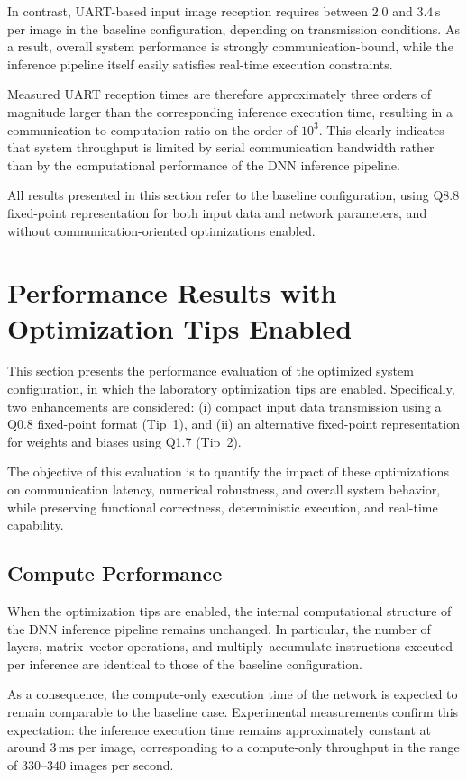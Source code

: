 In contrast, UART-based input image reception requires between $2.0$ and
$3.4\,\mathrm{s}$ per image in the baseline configuration, depending on transmission
conditions.
As a result, overall system performance is strongly communication-bound, while the
inference pipeline itself easily satisfies real-time execution constraints.

Measured UART reception times are therefore approximately three orders of magnitude
larger than the corresponding inference execution time, resulting in a
communication-to-computation ratio on the order of $10^3$.
This clearly indicates that system throughput is limited by serial communication
bandwidth rather than by the computational performance of the DNN inference
pipeline.

All results presented in this section refer to the baseline configuration, using
Q8.8 fixed-point representation for both input data and network parameters, and
without communication-oriented optimizations enabled.
\section{Performance Results with Optimization Tips Enabled}

This section presents the performance evaluation of the optimized system
configuration, in which the laboratory optimization tips are enabled.
Specifically, two enhancements are considered:
(i) compact input data transmission using a Q0.8 fixed-point format (Tip~1), and
(ii) an alternative fixed-point representation for weights and biases using Q1.7
(Tip~2).

The objective of this evaluation is to quantify the impact of these optimizations
on communication latency, numerical robustness, and overall system behavior,
while preserving functional correctness, deterministic execution, and real-time
capability.

\subsection{Compute Performance}

When the optimization tips are enabled, the internal computational structure of
the DNN inference pipeline remains unchanged.
In particular, the number of layers, matrix--vector operations, and
multiply--accumulate instructions executed per inference are identical to those
of the baseline configuration.

As a consequence, the compute-only execution time of the network is expected to
remain comparable to the baseline case.
Experimental measurements confirm this expectation: the inference execution time
remains approximately constant at around $3\,\mathrm{ms}$ per image, corresponding
to a compute-only throughput in the range of $330$--$340$ images per second.

